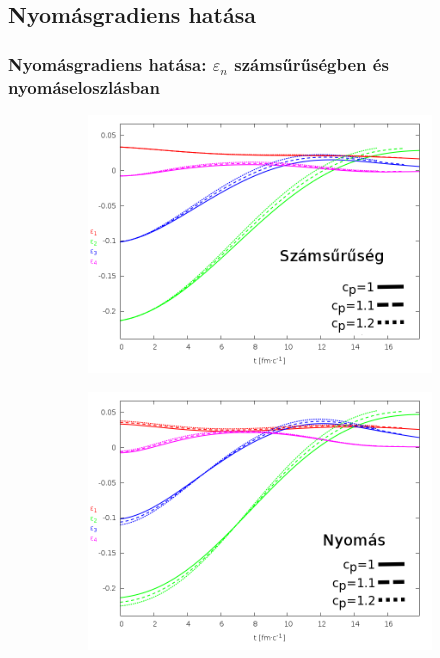 \documentclass{beamer}
\begin{document}
\subsection{Nyomásgradiens hatása}
\begin{frame}[noframenumbering]
\frametitle{Nyomásgradiens hatása: $\varepsilon_n$ számsűrűségben és nyomáseloszlásban}
\begin{center}
\begin{figure}[H]
	\centering
    \begin{subfigure}[b]{0.49\textwidth}
    		\includegraphics[width=\textwidth]{pic/res/rel/eps_pc_n}
	\end{subfigure}
	\begin{subfigure}[b]{0.49\textwidth}
        	\includegraphics[width=\textwidth]{pic/res/rel/eps_pc_p}
	\end{subfigure}
\end{figure}
\end{center}
\end{frame}
\end{document}
